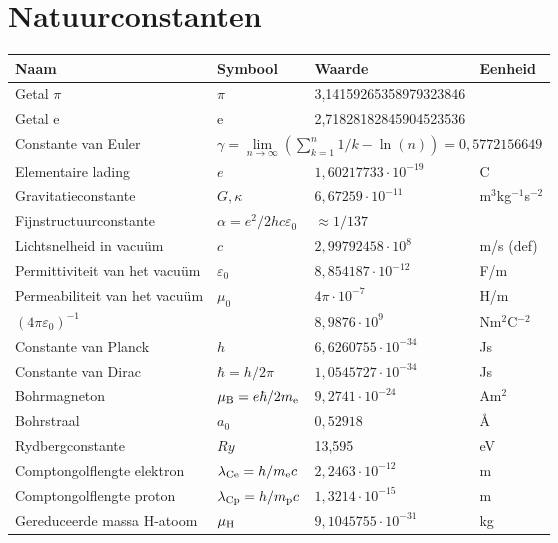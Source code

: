 \chapter*{\center Natuurconstanten}
\begin{center}
\begin{tabular}{||l|lll||}
\hline
{\bf Naam}&{\bf Symbool}&{\bf Waarde}&{\bf Eenheid}\\
\hline
\hline
Getal $\pi$                    &$\pi$&3,14159265358979323846&\\
Getal e                        &e    &2,71828182845904523536&\\
Constante van Euler&\multicolumn{3}{|l||}{$\gamma=\lim\limits_{n\rightarrow\infty}\left(\sum\limits_{k=1}^n 1/k-\ln(n)\right)=0,5772156649$}\\
\hline
Elementaire lading             &$e$&$1,60217733\cdot10^{-19}$&C\rule{0pt}{13pt}\\
Gravitatieconstante            &$G,\kappa$&$6,67259\cdot10^{-11}$&m$^3$kg$^{-1}$s$^{-2}$\\
Fijnstructuurconstante         &$\alpha=e^2/2hc\varepsilon_0$&$\approx1/137$&\\
Lichtsnelheid in vacu\"um      &$c$&$2,99792458\cdot10^8$&m/s (def)\\
Permittiviteit van het vacu\"um&$\varepsilon_0$&$8,854187\cdot10^{-12}$&F/m\\
Permeabiliteit van het vacu\"um&$\mu_0$&$4\pi\cdot10^{-7}$&H/m\\
$(4\pi\varepsilon_0)^{-1}$     &&$8,9876\cdot10^9$&Nm$^2$C$^{-2}$\\
\hline
Constante van Planck           &$h$&$6,6260755\cdot10^{-34}$&Js\rule{0pt}{13pt}\\
Constante van Dirac            &$\hbar=h/2\pi$&$1,0545727\cdot10^{-34}$&Js\\
Bohrmagneton                   &$\mu_{\rm B}=e\hbar/2m_{\rm e}$&$9,2741\cdot10^{-24}$&Am$^2$\\
Bohrstraal                     &$a_0$&$0,52918$&\AA\\
Rydbergconstante               &$Ry$&13,595&eV\\
Comptongolflengte elektron     &$\lambda_{\rm Ce}=h/m_{\rm e} c$&$2,2463\cdot10^{-12}$&m\\
Comptongolflengte proton       &$\lambda_{\rm Cp}=h/m_{\rm p}c$&$1,3214\cdot10^{-15}$&m\\
Gereduceerde massa H-atoom     &$\mu_{\rm H}$&$9,1045755\cdot10^{-31}$&kg\\

\end{tabular}
\end{center}
